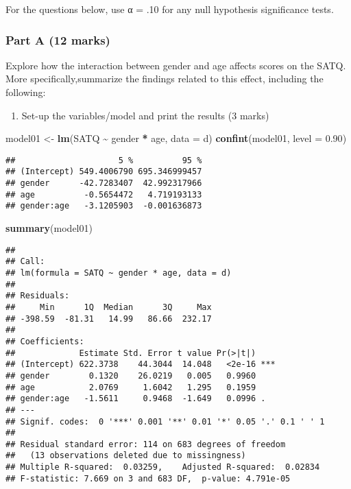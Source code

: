 \documentclass[
]{article}
\newenvironment{Shaded}{\begin{snugshade}}{\end{snugshade}}
\newcommand{\AttributeTok}[1]{\textcolor[rgb]{0.13,0.29,0.53}{#1}}
\newcommand{\FloatTok}[1]{\textcolor[rgb]{0.00,0.00,0.81}{#1}}
\newcommand{\FunctionTok}[1]{\textcolor[rgb]{0.13,0.29,0.53}{\textbf{#1}}}
\newcommand{\NormalTok}[1]{#1}
\newcommand{\OtherTok}[1]{\textcolor[rgb]{0.56,0.35,0.01}{#1}}
\newcommand{\SpecialCharTok}[1]{\textcolor[rgb]{0.81,0.36,0.00}{\textbf{#1}}}
\providecommand{\tightlist}{%
  \setlength{\itemsep}{0pt}\setlength{\parskip}{0pt}}
\begin{document}
For the questions below, use α = .10 for any null hypothesis
significance tests.

\hypertarget{part-a-12-marks}{%
\subsubsection{Part A (12 marks)}\label{part-a-12-marks}}

Explore how the interaction between gender and age affects scores on the
SATQ. More specifically,summarize the findings related to this effect,
including the following:

\begin{enumerate}
\def\labelenumi{\arabic{enumi})}
\tightlist
\item
  Set-up the variables/model and print the results (3 marks)
\end{enumerate}

\begin{Shaded}
\begin{Highlighting}[]
\NormalTok{model01 }\OtherTok{\textless{}{-}} \FunctionTok{lm}\NormalTok{(SATQ }\SpecialCharTok{\textasciitilde{}}\NormalTok{ gender }\SpecialCharTok{*}\NormalTok{ age, }\AttributeTok{data =}\NormalTok{ d)}
\FunctionTok{confint}\NormalTok{(model01, }\AttributeTok{level =} \FloatTok{0.90}\NormalTok{)}
\end{Highlighting}
\end{Shaded}

\begin{verbatim}
##                     5 %          95 %
## (Intercept) 549.4006790 695.346999457
## gender      -42.7283407  42.992317966
## age          -0.5654472   4.719193133
## gender:age   -3.1205903  -0.001636873
\end{verbatim}

\begin{Shaded}
\begin{Highlighting}[]
\FunctionTok{summary}\NormalTok{(model01)}
\end{Highlighting}
\end{Shaded}

\begin{verbatim}
## 
## Call:
## lm(formula = SATQ ~ gender * age, data = d)
## 
## Residuals:
##     Min      1Q  Median      3Q     Max 
## -398.59  -81.31   14.99   86.66  232.17 
## 
## Coefficients:
##             Estimate Std. Error t value Pr(>|t|)    
## (Intercept) 622.3738    44.3044  14.048   <2e-16 ***
## gender        0.1320    26.0219   0.005   0.9960    
## age           2.0769     1.6042   1.295   0.1959    
## gender:age   -1.5611     0.9468  -1.649   0.0996 .  
## ---
## Signif. codes:  0 '***' 0.001 '**' 0.01 '*' 0.05 '.' 0.1 ' ' 1
## 
## Residual standard error: 114 on 683 degrees of freedom
##   (13 observations deleted due to missingness)
## Multiple R-squared:  0.03259,    Adjusted R-squared:  0.02834 
## F-statistic: 7.669 on 3 and 683 DF,  p-value: 4.791e-05
\end{verbatim}
\end{document}
